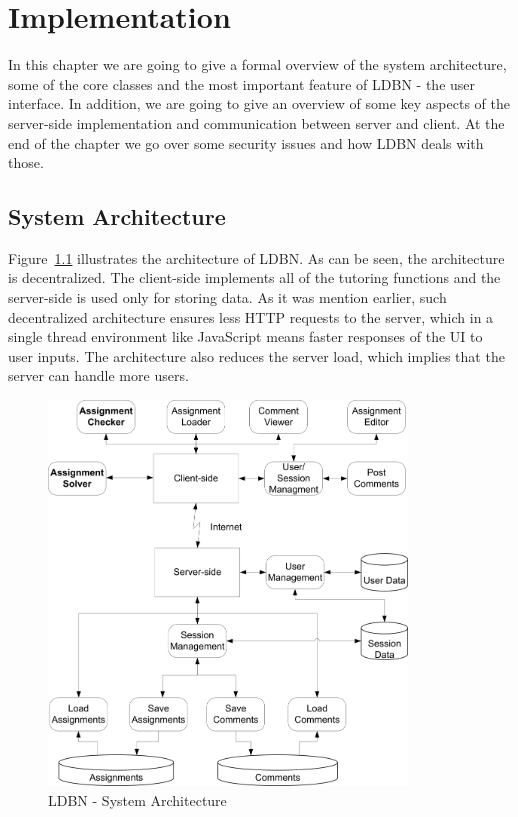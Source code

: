 \chapter{Implementation}
\label{chap:impl}
In this chapter we are going to give a formal overview of the system architecture,
some of the core classes and the most important
feature of LDBN - the user interface. In addition, we are going to give an overview
of some key aspects of the server-side implementation and communication
between server and client. At the end of the chapter we go over some
security issues and how LDBN deals with those. 

\section{System Architecture}
Figure~\ref{fig:sysarch} illustrates the architecture of LDBN. 
As can be seen, the architecture is decentralized. The client-side implements 
all of the tutoring functions and the server-side is used only for storing data.
As it was mention earlier, such decentralized architecture ensures less HTTP requests to
the server, which in a single thread environment like JavaScript means faster 
responses of the UI to user inputs. The architecture also reduces the server load,
which implies that the server can handle more users.

\begin{figure}[h]
	\begin{center}
		\includegraphics[width=0.85\textwidth]{./img/architecture01.png}
		\caption{LDBN - System Architecture}
		\label{fig:sysarch}
	\end{center}
\end{figure}

